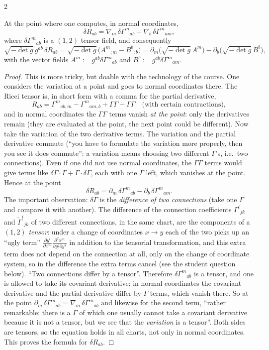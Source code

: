 \begin{paracol}{2}
\begin{lemma}\label{lem:c15-ricci}
At the point where one computes, in normal coordinates,
\[
  \delta R_{ab}=\nabla_m\,\delta\Gamma^m{}_{ab}-\nabla_b\,\delta\Gamma^m{}_{am},
\]
where $\delta\Gamma^m{}_{ab}$ is a $(1,2)$ tensor field, and consequently
\[
  \sqrt{-\det g}\,g^{ab}\,\delta R_{ab}=\sqrt{-\det g}\,\bigl(A^m{}_{;m}-B^b{}_{;b}\bigr)=\partial_m\bigl(\sqrt{-\det g}\,A^m\bigr)-\partial_b\bigl(\sqrt{-\det g}\,B^b\bigr),
\]
with the vector fields $A^m:=g^{ab}\delta\Gamma^m{}_{ab}$ and $B^b:=g^{ab}\delta\Gamma^m{}_{am}$.
\end{lemma}
\begin{proof}
This is more tricky, but doable with the technology of the course. One considers the variation at a point and goes to normal coordinates there. The Ricci tensor is, in short form with a comma for the partial derivative,
\[
  R_{ab}=\Gamma^m{}_{ab,m}-\Gamma^m{}_{am,b}+\Gamma\Gamma-\Gamma\Gamma\quad\text{(with certain contractions)},
\]
and in normal coordinates the $\Gamma\Gamma$ terms vanish \emph{at the point}: only the derivatives remain (they are evaluated at the point, the next point could be different). Now take the variation of the two derivative terms. The variation and the partial derivative commute (``you have to formulate the variation more properly, then you see it does commute'': a variation means choosing two different $\Gamma$'s, i.e.\ two connections). Even if one did not use normal coordinates, the $\Gamma\Gamma$ terms would give terms like $\delta\Gamma\cdot\Gamma+\Gamma\cdot\delta\Gamma$, each with one $\Gamma$ left, which vanishes at the point. Hence at the point
\[
  \delta R_{ab}=\partial_m\,\delta\Gamma^m{}_{ab}-\partial_b\,\delta\Gamma^m{}_{am}.
\]
The important observation: $\delta\Gamma$ is the \emph{difference of two connections} (take one $\Gamma$ and compare it with another). The difference of the connection coefficients $\Gamma^i{}_{jk}$ and $\tilde\Gamma^i{}_{jk}$ of two different connections, in the same chart, are the components of a $(1,2)$ \emph{tensor}: under a change of coordinates $x\to y$ each of the two picks up an ``ugly term'' $\frac{\partial y^i}{\partial x^m}\frac{\partial^2x^m}{\partial y^j\partial y^k}$ in addition to the tensorial transformation, and this extra term does not depend on the connection at all, only on the change of coordinate system, so in the difference the extra terms cancel (see the student question below). ``Two connections differ by a tensor''. Therefore $\delta\Gamma^m{}_{ab}$ is a tensor, and one is allowed to take its covariant derivative; in normal coordinates the covariant derivative and the partial derivative differ by $\Gamma$ terms, which vanish there. So at the point $\partial_m\,\delta\Gamma^m{}_{ab}=\nabla_m\,\delta\Gamma^m{}_{ab}$ and likewise for the second term, ``rather remarkable: there is a $\Gamma$ of which one usually cannot take a covariant derivative because it is not a tensor, but we see that the \emph{variation} is a tensor''. Both sides are tensors, so the equation holds in all charts, not only in normal coordinates. This proves the formula for $\delta R_{ab}$.


\end{proof}
\end{paracol}
